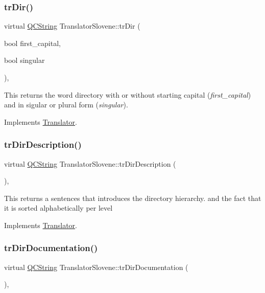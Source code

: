 \subsubsection{\texorpdfstring{trDir()}{trDir()}}
{\footnotesize\ttfamily virtual \mbox{\hyperlink{class_q_c_string}{Q\+C\+String}} Translator\+Slovene\+::tr\+Dir (\begin{DoxyParamCaption}\item[{bool}]{first\+\_\+capital,  }\item[{bool}]{singular }\end{DoxyParamCaption})\hspace{0.3cm}{\ttfamily [inline]}, {\ttfamily [virtual]}}

This returns the word directory with or without starting capital ({\itshape first\+\_\+capital}) and in sigular or plural form ({\itshape singular}). 

Implements \mbox{\hyperlink{class_translator}{Translator}}.

\mbox{\label{class_translator_slovene_ae3ac658a4e9073148fe3a021b1ca67e1}} 
\subsubsection{\texorpdfstring{trDirDescription()}{trDirDescription()}}
{\footnotesize\ttfamily virtual \mbox{\hyperlink{class_q_c_string}{Q\+C\+String}} Translator\+Slovene\+::tr\+Dir\+Description (\begin{DoxyParamCaption}{ }\end{DoxyParamCaption})\hspace{0.3cm}{\ttfamily [inline]}, {\ttfamily [virtual]}}

This returns a sentences that introduces the directory hierarchy. and the fact that it is sorted alphabetically per level 

Implements \mbox{\hyperlink{class_translator}{Translator}}.

\mbox{\label{class_translator_slovene_a0a7b1a2c7f83f2c655fe28e3ddda8bf9}} 
\subsubsection{\texorpdfstring{trDirDocumentation()}{trDirDocumentation()}}
{\footnotesize\ttfamily virtual \mbox{\hyperlink{class_q_c_string}{Q\+C\+String}} Translator\+Slovene\+::tr\+Dir\+Documentation (\begin{DoxyParamCaption}{ }\end{DoxyParamCaption})\hspace{0.3cm}{\ttfamily [inline]}, {\ttfamily [virtual]}}

